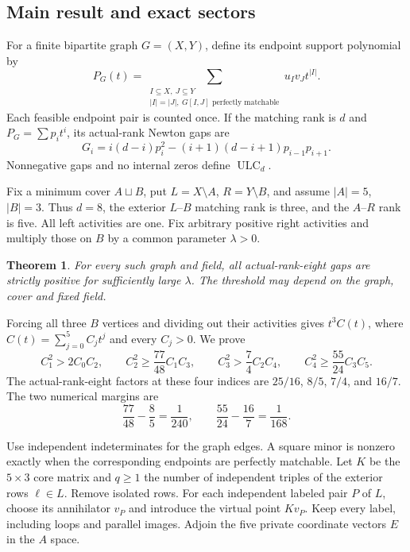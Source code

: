\documentclass[11pt,a4paper]{article}
\newtheorem{theorem}{Theorem}[section]
\theoremstyle{remark}\newtheorem{remark}[theorem]{Remark}
\newcommand{\ULC}{\operatorname{ULC}}      %
\begin{document}
\subsection{Main result and exact sectors}
For a finite bipartite graph $G=(X,Y)$, define its endpoint support polynomial by
\[
 P_G(t)=\sum_{\substack{I\subseteq X,\ J\subseteq Y\\|I|=|J|,\ G[I,J]\text{ perfectly matchable}}}u_Iv_Jt^{|I|}.
\]
Each feasible endpoint pair is counted once. If the matching rank is $d$ and $P_G=\sum p_it^i$, its actual-rank Newton gaps are
\begin{equation}\label{mrn:e:fp:eq:gaps}
 G_i=i(d-i)p_i^2-(i+1)(d-i+1)p_{i-1}p_{i+1}.
\end{equation}
Nonnegative gaps and no internal zeros define $\ULC_d$.

Fix a minimum cover $A\sqcup B$, put $L=X\setminus A$, $R=Y\setminus B$, and assume $|A|=5$, $|B|=3$. Thus $d=8$, the exterior $L$--$B$ matching rank is three, and the $A$--$R$ rank is five. All left activities are one. Fix arbitrary positive right activities and multiply those on $B$ by a common parameter $\lambda>0$.

\begin{theorem}\label{mrn:e:fp:thm:main}
For every such graph and field, all actual-rank-eight gaps are strictly positive for sufficiently large $\lambda$. The threshold may depend on the graph, cover and fixed field.
\end{theorem}
Forcing all three $B$ vertices and dividing out their activities gives $t^3 C(t)$, where $C(t)=\sum_{j=0}^5 C_jt^j$ and every $C_j>0$. We prove
\begin{equation}\label{mrn:e:fp:eq:targets}
 C_1^2>2C_0C_2,\qquad
 C_2^2\ge\frac{77}{48}C_1C_3,\qquad
 C_3^2>\frac74C_2C_4,\qquad
 C_4^2\ge\frac{55}{24}C_3C_5.
\end{equation}
The actual-rank-eight factors at these four indices are $25/16$, $8/5$, $7/4$, and $16/7$. The two numerical margins are
\[
 \frac{77}{48}-\frac85=\frac1{240},\qquad
 \frac{55}{24}-\frac{16}{7}=\frac1{168}.
\]

Use independent indeterminates for the graph edges. A square minor is nonzero exactly when the corresponding endpoints are perfectly matchable. Let $K$ be the $5\times3$ core matrix and $q\ge1$ the number of independent triples of the exterior rows $\ell\in L$. Remove isolated rows. For each independent labeled pair $P$ of $L$, choose its annihilator $v_P$ and introduce the virtual point $Kv_P$. Keep every label, including loops and parallel images. Adjoin the five private coordinate vectors $E$ in the $A$ space.
\end{document}
